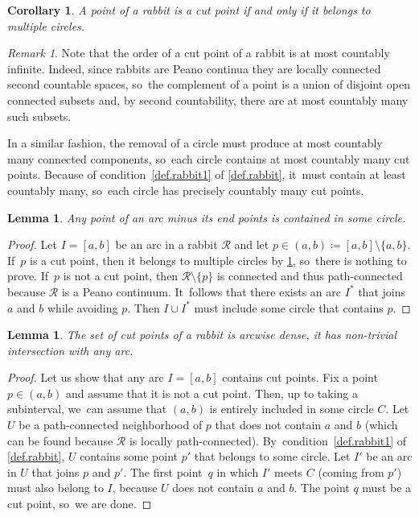 \documentclass[JEP,XML,SOM,Unicode,NoFloatCountersInSection,published]{cedram}
\theoremstyle{plain}
\newtheorem{corollary}[theorem]{Corollary}
\newtheorem{lemma}[theorem]{Lemma}
\theoremstyle{definition}
\theoremstyle{remark}
\newtheorem{remark}[theorem]{Remark}
\newcommand{\R}{\mathcal{R}}
\begin{document}
\begin{corollary}
\label{cor.rabbit.cut.points}
A point of a rabbit is a cut point if and only if it belongs to multiple circles.
\end{corollary}

\begin{remark}
\label{rmk.rabbit.countable}
Note that the order of a cut point of a rabbit is at most countably infinite.
Indeed, since rabbits are Peano continua they are locally connected second countable spaces, so~the complement of a point is a union of disjoint open connected subsets and, by second countability, there are at most countably many such subsets.

In a similar fashion, the removal of a circle must produce at most countably many connected components, so~each circle contains at most countably many cut points.
Because of condition~\cref{def.rabbit1} of \cref{def.rabbit}, it~must contain at least countably many, so~each circle has precisely countably many cut points.
\end{remark}

\begin{lemma}
\label{lem.rabbit.arcs.and.circles}
Any point of an arc minus its end points is contained in some circle.
\end{lemma}

\begin{proof}
Let $I = [a,b]$ be an arc in a rabbit $\R$ and let $p \in (a,b) \coloneqq [a,b] \setminus \{a,b\}$. If~$p$ is a cut point, then it belongs to multiple circles by \cref{cor.rabbit.cut.points}, so~there is nothing to prove. If~$p$ is not a cut point, then $\R \setminus \{p\}$ is connected and thus path-connected because $\R$ is a Peano continuum. It~follows that there exists an arc $I^*$ that joins $a$ and $b$ while avoiding $p$.
Then $I \cup I^*$ must include some circle that contains $p$.
\end{proof}

\begin{lemma}
The set of cut points of a rabbit is arcwise dense, \ie it has non-trivial intersection with any arc.
\end{lemma}

\begin{proof}
Let us show that any arc $I=[a,b]$ contains cut points.
Fix a point $p \in (a,b)$ and assume that it is not a cut point.
Then, up to taking a subinterval, we~can assume that $(a,b)$ is entirely included in some circle $C$.
Let $U$ be a path-connected neighborhood of $p$ that does not contain $a$ and $b$ (which can be found because $\R$ is locally path-connected). By~condition~\cref{def.rabbit1} of \cref{def.rabbit}, $U$ contains some point $p'$ that belongs to some circle.
Let $I'$ be an arc in $U$ that joins $p$ and $p'$.
The first point~$q$ in which $I'$ meets $C$ (coming from $p'$) must also belong to $I$, because $U$ does not contain $a$ and $b$.
The point $q$ must be a cut point, so~we are done.
\end{proof}
\end{document}
